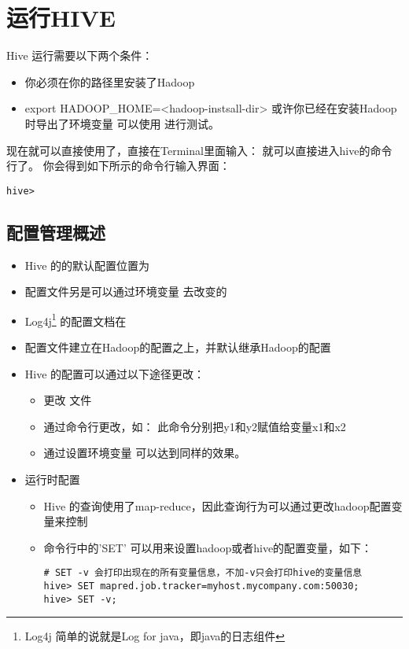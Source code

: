 \documentclass{article}
\begin{document}
\section{运行HIVE}
Hive 运行需要以下两个条件：

\begin{itemize}
\item 你必须在你的路径里安装了Hadoop
\item export HADOOP\_HOME=<hadoop-instsall-dir> 或许你已经在安装Hadoop时导出了环境变量
可以使用 进行测试。
\end{itemize}

现在就可以直接使用了，直接在Terminal里面输入： 就可以直接进入hive的命令行了。
你会得到如下所示的命令行输入界面：

\begin{verbatim}
hive>
\end{verbatim}

\subsection{配置管理概述}
\begin{itemize}
\item Hive 的的默认配置位置为
\item 配置文件另是可以通过环境变量 去改变的
\item Log4j\footnote{Log4j 简单的说就是Log for java，即java的日志组件} 
的配置文档在
\item 配置文件建立在Hadoop的配置之上，并默认继承Hadoop的配置
\item Hive 的配置可以通过以下途径更改：
	\begin{itemize}
	\item 更改 文件
	\item 通过命令行更改，如：
	此命令分别把y1和y2赋值给变量x1和x2
	\item 通过设置环境变量 可以达到同样的效果。
	\end{itemize}
\item 运行时配置
	\begin{itemize}
	\item Hive 的查询使用了map-reduce，因此查询行为可以通过更改hadoop配置变量来控制
	\item 命令行中的'SET' 可以用来设置hadoop或者hive的配置变量，如下：

\begin{verbatim}
# SET -v 会打印出现在的所有变量信息，不加-v只会打印hive的变量信息
hive> SET mapred.job.tracker=myhost.mycompany.com:50030;
hive> SET -v;
\end{verbatim}

	\end{itemize}
\end{itemize}
\end{document}
